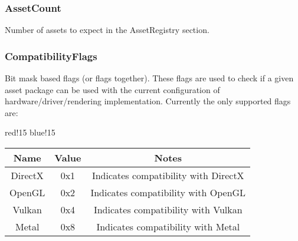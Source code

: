 \subsubsection{AssetCount}
Number of assets to expect in the AssetRegistry section.

\subsubsection{CompatibilityFlags}
Bit mask based flags (or flags together). These flags are used to check if a given asset package can be used with the current configuration of hardware/driver/rendering implementation.\newline
Currently the only supported flags are:
\begin{center}
    {
        {red!15}
        {blue!15}
        \begin{tabular}{|c|c|c|}
            \hline
            \textbf{Name} & \textbf{Value} & \textbf{Notes} \\
    
            \hline\hline
            DirectX & 0x1 & Indicates compatibility with DirectX \cite{DirectX} \\
            OpenGL & 0x2 & Indicates compatibility with OpenGL \cite{OpenGL} \\
            Vulkan & 0x4 & Indicates compatibility with Vulkan \cite{Vulkan} \\
            Metal & 0x8 & Indicates compatibility with Metal \cite{Metal} \\
            \hline
        \end{tabular}
    }
\end{center}

